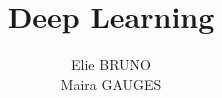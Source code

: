 \documentclass[9pt]{extarticle}
\title{Deep Learning}
\author{Elie BRUNO \\ Maira GAUGES}
\begin{document}

\tableofcontents
\newpage
%
\twocolumn




\onecolumn

\end{document}
